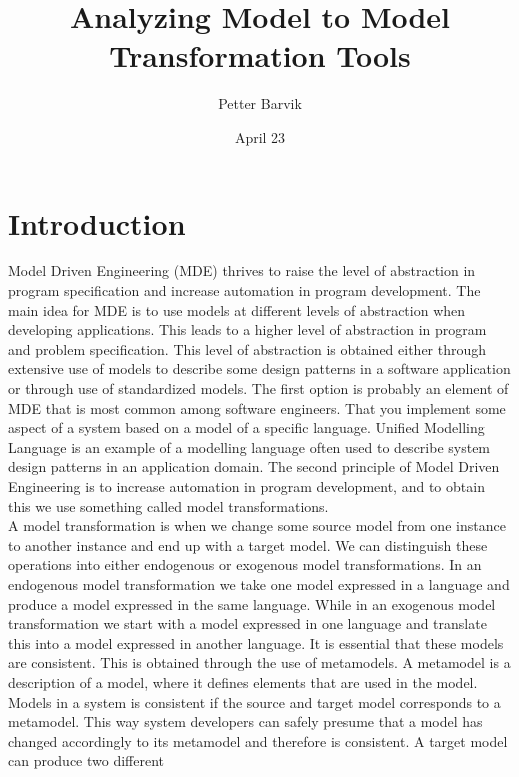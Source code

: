 \documentclass[pdftex,11pt,a4paper]{article}
\begin{document}
\title{Analyzing Model to Model Transformation
	   Tools}
\date{April 23}
\author{Petter Barvik}

\maketitle

\abstract{}

\newpage
\section{Introduction}

\noindent Model Driven Engineering (MDE)\cite{France2007} thrives to raise the
level of abstraction in program specification and increase automation in program
development. The main idea for MDE is to use models at different levels of
abstraction when developing applications. This leads to a higher level
of abstraction in program and problem specification. This level of abstraction
is obtained either through extensive use of models to describe some design
patterns in a software application or through use of standardized models. The
first option is probably an element of MDE that is most common among software
engineers. That you implement some aspect of a system based on a model of a 
specific language. Unified Modelling Language is an example of a modelling
language often used to describe system design patterns in an application
domain. The second principle of Model Driven Engineering is to increase
automation in program development, and to obtain this we use something called
model transformations. \\
\indent A model transformation is when we change some source model from one
instance to another instance and end up with a target model. We can
distinguish these operations into either endogenous or exogenous model
transformations. In an endogenous model transformation we take one model
expressed in a language and produce a model expressed in the same language.
While in an exogenous model transformation we start with a model
expressed in one language and translate this into a model expressed in another
language. It is essential that these models are consistent. This is obtained
through the use of metamodels. A metamodel is a description of a model, where
it defines elements that are used in the model. Models in a system is consistent
if the source and target model corresponds to a metamodel. This way system
developers can safely presume that a model has changed accordingly to its
metamodel and therefore is consistent. A target model can produce two different
\end{document}
